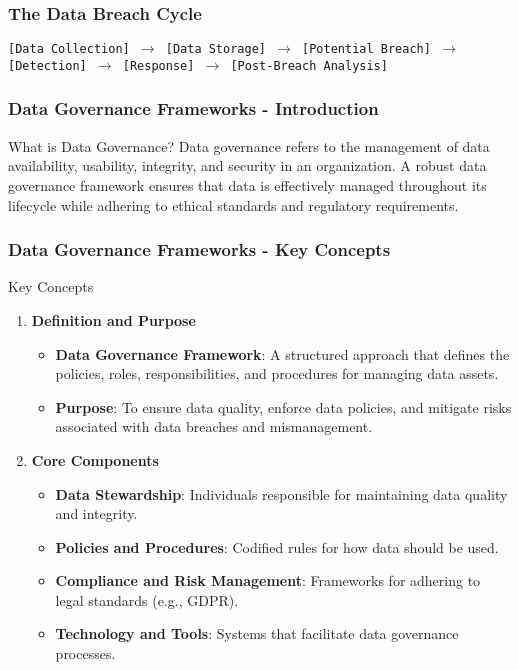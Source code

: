 \documentclass[aspectratio=169]{beamer}
\begin{document}
\begin{frame}[fragile]
    \frametitle{The Data Breach Cycle}
    \begin{center}
        \texttt{[Data Collection] $\rightarrow$ [Data Storage] $\rightarrow$ [Potential Breach] $\rightarrow$ [Detection] $\rightarrow$ [Response] $\rightarrow$ [Post-Breach Analysis]}
    \end{center}
\end{frame}

\begin{frame}[fragile]
    \frametitle{Data Governance Frameworks - Introduction}
    \begin{block}{What is Data Governance?}
        Data governance refers to the management of data availability, usability, integrity, and security in an organization. A robust data governance framework ensures that data is effectively managed throughout its lifecycle while adhering to ethical standards and regulatory requirements.
    \end{block}
\end{frame}

\begin{frame}[fragile]
    \frametitle{Data Governance Frameworks - Key Concepts}
    \begin{block}{Key Concepts}
        \begin{enumerate}
            \item \textbf{Definition and Purpose}
            \begin{itemize}
                \item \textbf{Data Governance Framework}:
                A structured approach that defines the policies, roles, responsibilities, and procedures for managing data assets.
                \item \textbf{Purpose}:
                To ensure data quality, enforce data policies, and mitigate risks associated with data breaches and mismanagement.
            \end{itemize}
            
            \item \textbf{Core Components}
            \begin{itemize}
                \item \textbf{Data Stewardship}: Individuals responsible for maintaining data quality and integrity.
                \item \textbf{Policies and Procedures}: Codified rules for how data should be used.
                \item \textbf{Compliance and Risk Management}: Frameworks for adhering to legal standards (e.g., GDPR).
                \item \textbf{Technology and Tools}: Systems that facilitate data governance processes.
            \end{itemize}
        \end{enumerate}
    \end{block}
\end{frame}
\end{document}
